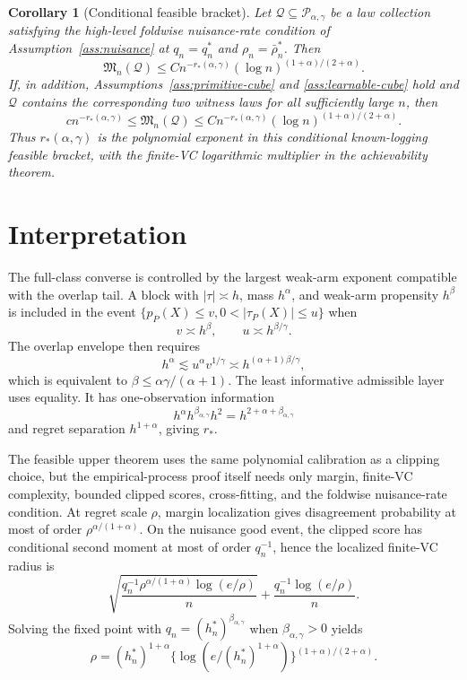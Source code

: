 \documentclass[11pt]{article}
\theoremstyle{definition}
\theoremstyle{plain}
\newtheorem{corollary}{Corollary}
\theoremstyle{remark}
\begin{document}
\begin{corollary}[Conditional feasible bracket]\label{cor:feasible-bracket}
Let \(\mathcal Q\subseteq\mathcal P_{\alpha,\gamma}\) be a law collection
satisfying the high-level foldwise nuisance-rate condition of
Assumption~\ref{ass:nuisance} at \(q_n=q_n^*\) and
\(\rho_n=\bar\rho_n^*\).  Then
\[
\mathfrak M_n(\mathcal Q)
\le
C n^{-r_*(\alpha,\gamma)}(\log n)^{(1+\alpha)/(2+\alpha)}.
\]
If, in addition, Assumptions~\ref{ass:primitive-cube} and
\ref{ass:learnable-cube} hold and \(\mathcal Q\) contains the corresponding
two witness laws for all sufficiently large \(n\), then
\[
c n^{-r_*(\alpha,\gamma)}
\le
\mathfrak M_n(\mathcal Q)
\le
C n^{-r_*(\alpha,\gamma)}(\log n)^{(1+\alpha)/(2+\alpha)}.
\]
Thus \(r_*(\alpha,\gamma)\) is the polynomial exponent in this conditional
known-logging feasible bracket, with the finite-VC logarithmic multiplier in
the achievability theorem.
\end{corollary}

\section{Interpretation}
The full-class converse is controlled by the largest weak-arm exponent
compatible with the overlap tail.  A block with \(|\tau|\asymp h\), mass
\(h^\alpha\), and weak-arm propensity \(h^\beta\) is included in the event
\(\{p_P(X)\le v,0<|\tau_P(X)|\le u\}\) when
\[
v\asymp h^\beta,\qquad u\asymp h^{\beta/\gamma}.
\]
The overlap envelope then requires
\[
h^\alpha\lesssim u^\alpha v^{1/\gamma}
\asymp h^{(\alpha+1)\beta/\gamma},
\]
which is equivalent to
\(\beta\le\alpha\gamma/(\alpha+1)\).  The least informative admissible layer
uses equality.  It has one-observation information
\[
h^\alpha h^{\beta_{\alpha,\gamma}}h^2
=h^{2+\alpha+\beta_{\alpha,\gamma}}
\]
and regret separation \(h^{1+\alpha}\), giving \(r_*\).

The feasible upper theorem uses the same polynomial calibration as a
clipping choice, but the empirical-process proof itself needs only margin,
finite-VC complexity, bounded clipped scores, cross-fitting, and the
foldwise nuisance-rate condition.  At regret scale \(\rho\), margin
localization gives disagreement probability at most of order
\(\rho^{\alpha/(1+\alpha)}\).  On the nuisance good event, the clipped score
has conditional second moment at most of order \(q_n^{-1}\), hence the
localized finite-VC radius is
\[
\sqrt{\frac{q_n^{-1}\rho^{\alpha/(1+\alpha)}
\log(e/\rho)}{n}}
+\frac{q_n^{-1}\log(e/\rho)}{n}.
\]
Solving the fixed point with \(q_n=(h_n^*)^{\beta_{\alpha,\gamma}}\) when
\(\beta_{\alpha,\gamma}>0\) yields
\[
\rho=
(h_n^*)^{1+\alpha}
\{\log(e/(h_n^*)^{1+\alpha})\}^{(1+\alpha)/(2+\alpha)}.
\]
\end{document}
